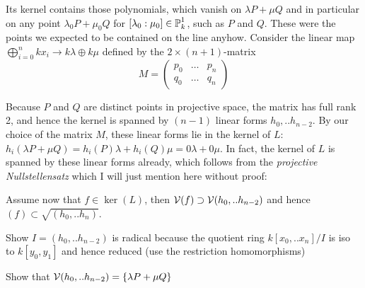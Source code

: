 Its kernel contains those polynomials, which vanish on $\lambda P + \mu Q$ and in particular on any point $\lambda_0 P + \mu_0 Q$ for $[\lambda_0:\mu_0] \in \operatorname{\mathbb P}^1_k$, such as $P$ and $Q$.
These were the points we expected to be contained on the line anyhow.
Consider the linear map $\bigoplus_{i=0}^n kx_i \to k\lambda \oplus k\mu$ defined by the $2\times (n+1)$-matrix
\begin{equation}
M=
\begin{pmatrix}
p_0 & \ldots & p_n \\
q_0 & \ldots & q_n
\end{pmatrix}
\end{equation}

Because $P$ and $Q$ are distinct points in projective space, the matrix has full rank 2, and hence the kernel is spanned by $(n-1)$ linear forms $h_0,..h_{n-2}$.
By our choice of the matrix $M$, these linear forms lie in the kernel of $L$: $h_i(\lambda P + \mu Q) = h_i(P) \lambda + h_i(Q)\mu = 0 \lambda + 0 \mu$.
In fact, the kernel of $L$ is spanned by these linear forms already, which follows from the \emph{projective Nullstellensatz} which I will just mention here without proof:

\begin{theorem}
\end{theorem}

Assume now that $f \in \ker(L)$, then $\operatorname{\mathcal V}(f) \supset \operatorname{\mathcal V}(h_0,..h_{n-2})$ and hence $(f) \subset \sqrt{(h_0,..h_n)}$.

\begin{todo}
\item Show $I = (h_0,..h_{n-2})$ is radical because the quotient ring $k[x_0,..x_n]/I$ is iso to $k[y_0,y_1]$ and hence reduced (use the restriction homomorphisms)
\item Show that $\operatorname{\mathcal V}(h_0,..h_{n-2}) = \{ \lambda P + \mu Q \}$
\end{todo}


